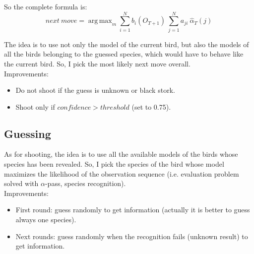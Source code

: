 \documentclass{scrartcl}
\DeclareMathOperator*{\argmax}{arg\,max}
\begin{document}
So the complete formula is:
\begin{equation}
 next\ move = \argmax_{m} \sum_{i=1}^N b_i(O_{T+1})\ \sum_{j=1}^N a_{ji}\ \hat{\alpha}_T(j)
\end{equation}

The idea is to use not only the model of the current bird, but also the models of all the birds belonging to the guessed species, which would have to behave like the current bird. So, I pick the most likely next move overall. \\

Improvements:
\begin{itemize}
 \item Do not shoot if the guess is unknown or black stork.
 \item Shoot only if $confidence > threshold$ (set to 0.75).
\end{itemize}

\subsection{Guessing}
As for shooting, the idea is to use all the available models of the birds whose species has been revealed. So, I pick the species of the bird whose model maximizes the likelihood of the observation sequence (i.e. evaluation problem solved with $\alpha$-pass, species recognition). \\

Improvements:
\begin{itemize}
 \item First round: guess randomly to get information (actually it is better to guess always one species).
 \item Next rounds: guess randomly when the recognition fails (unknown result) to get information.
\end{itemize}


\clearpage
\newpage
\printbibliography
\end{document}
